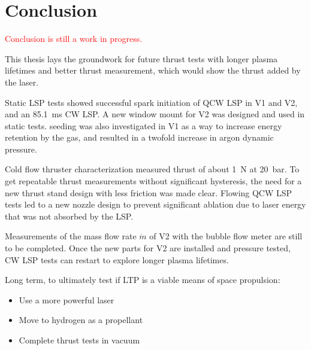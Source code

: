 \chapter{Conclusion}

    \textcolor{red}{Conclusion is still a work in progress.}

    This thesis lays the groundwork for future thrust tests with longer plasma lifetimes and better thrust measurement, which would show the thrust added by the laser.

    Static LSP tests showed successful spark initiation of QCW LSP in V1 and V2, and an \qty{85.1}{ms} CW LSP. A new window mount for V2 was designed and used in static tests.  seeding was also investigated in V1 as a way to increase energy retention by the gas, and resulted in a twofold increase in argon dynamic pressure. 

    Cold flow thruster characterization measured thrust of about \qty{1}{N} at \qty{20}{bar}. To get repeatable thrust measurements without significant hysteresis, the need for a new thrust stand design with less friction was made clear. Flowing QCW LSP tests led to a new nozzle design to prevent significant ablation due to laser energy that was not absorbed by the LSP. 
    
    Measurements of the mass flow rate $\dot m$ of V2 with the bubble flow meter are still to be completed. Once the new parts for V2 are installed and pressure tested, CW LSP tests can restart to explore longer plasma lifetimes.

    Long term, to ultimately test if LTP is a viable means of space propulsion:
    \begin{itemize}
        \item Use a more powerful laser
        \item Move to hydrogen as a propellant
        \item Complete thrust tests in vacuum
    \end{itemize}